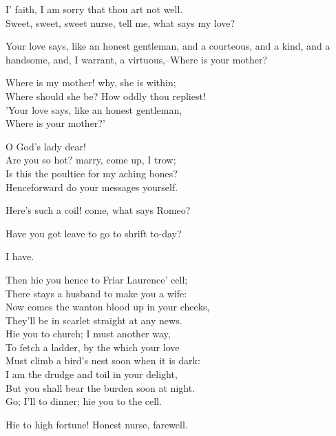 \begin{speech}
I' faith, I am sorry that thou art not well. \\
Sweet, sweet, sweet nurse, tell me, what says my love? \\
\end{speech}
\begin{speech}
Your love says, like an honest gentleman,
and a courteous, and a kind, and a
handsome, and, I warrant, a virtuous,--Where
is your mother?
\end{speech}
\begin{speech}
Where is my mother! why, she is within; \\
Where should she be? How oddly thou repliest! \\
'Your love says, like an honest gentleman, \\
Where is your mother?' \\
\end{speech}
\begin{speech}
O God's lady dear! \\
Are you so hot? marry, come up, I trow; \\
Is this the poultice for my aching bones? \\
Henceforward do your messages yourself. \\
\end{speech}
\begin{speech}
Here's such a coil! come, what says Romeo? \\
\end{speech}
\begin{speech}
Have you got leave to go to shrift to-day? \\
\end{speech}
\begin{speech}
I have. \\
\end{speech}
\begin{speech}
Then hie you hence to Friar Laurence' cell; \\
There stays a husband to make you a wife: \\
Now comes the wanton blood up in your cheeks, \\
They'll be in scarlet straight at any news. \\
Hie you to church; I must another way, \\
To fetch a ladder, by the which your love \\
Must climb a bird's nest soon when it is dark: \\
I am the drudge and toil in your delight, \\
But you shall bear the burden soon at night. \\
Go; I'll to dinner; hie you to the cell. \\
\end{speech}
\begin{speech}
Hie to high fortune! Honest nurse, farewell. 
\\
\end{speech}


